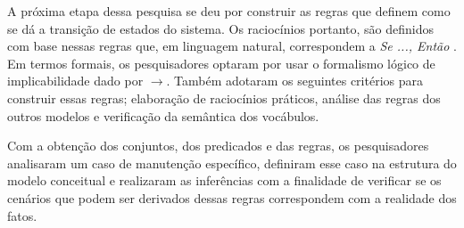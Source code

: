 A próxima etapa dessa pesquisa se deu por construir as regras que definem como se dá a transição de estados do sistema. Os raciocínios portanto, são definidos com base nessas regras que, em linguagem natural, correspondem a \textit{Se ..., Então }. Em termos formais, os pesquisadores optaram por usar o formalismo lógico de implicabilidade dado por $\to$. Também adotaram os seguintes critérios para construir essas regras; elaboração de raciocínios práticos, análise das regras dos outros modelos e verificação da semântica dos vocábulos.   

Com a obtenção dos conjuntos, dos predicados e das regras, os pesquisadores analisaram um caso de manutenção específico, definiram esse caso na estrutura do modelo conceitual e realizaram as inferências com a finalidade de verificar se os cenários que podem ser derivados dessas regras correspondem com a realidade dos fatos. 